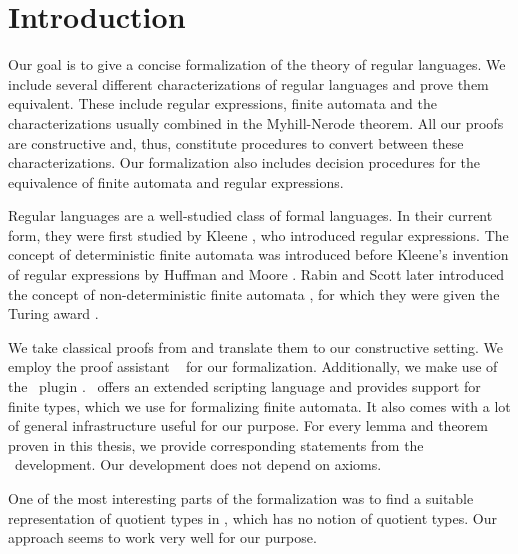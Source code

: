 \chapter{Introduction}
\label{chap:intro}

Our goal is to give a concise formalization of the theory of regular languages. 
We include several different characterizations of regular languages and prove them equivalent.
These include regular expressions, finite automata and the characterizations usually combined in the Myhill-Nerode theorem.
All our proofs are constructive and, thus, constitute procedures to convert between these characterizations.
Our formalization also includes decision procedures for the equivalence of finite automata and regular expressions.

Regular languages are a well-studied class of formal languages. 
In their current form, they were first studied by Kleene \cite{KleeneNets}, who introduced regular expressions. 
The concept of deterministic finite automata was introduced before Kleene's invention of regular expressions by Huffman \cite{Huffman1954161} and Moore \cite{Moore56}. 
Rabin and Scott later introduced the concept of non-deterministic finite automata \cite{Rabin:1959:FAD:1661907.1661909}, for which they were given the Turing award \cite{Ashenhurst:1987:ATA:27609}.

We take classical proofs from \cite{DBLP:books/daglib/0088160} and translate them to our constructive setting. 
We employ the proof assistant \coq\ \cite{Coq:manual} for our formalization.
Additionally, we make use of the \ssreflect\ plugin \cite{gonthier:inria-00258384}. 
\ssreflect\ offers an extended scripting language and provides support for finite types, which we use for formalizing finite automata. 
It also comes with a lot of general infrastructure useful for our purpose.
For every lemma and theorem proven in this thesis, we provide corresponding statements from the \coq\ development. 
Our development does not depend on axioms.

One of the most interesting parts of the formalization was to find a suitable representation of quotient types in \coq, which has no notion of quotient types.
Our approach seems to work very well for our purpose.



